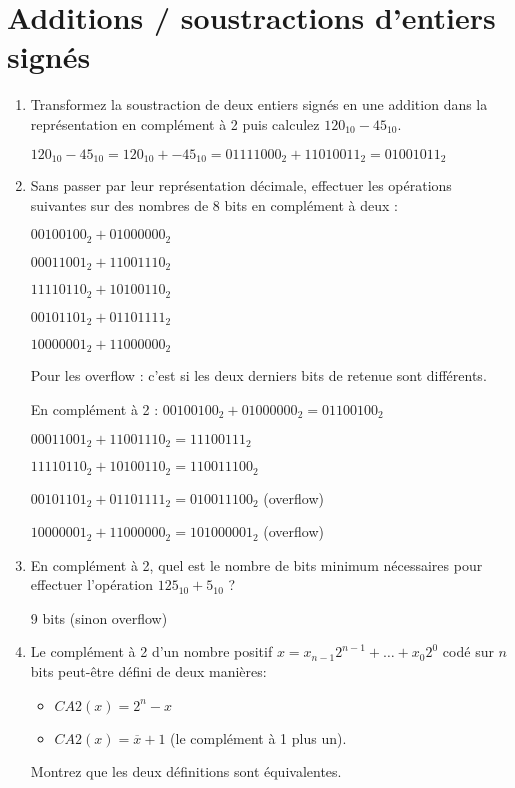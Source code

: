 \documentclass[a4paper,10pt]{exam}
\begin{document}
\section{Additions / soustractions d'entiers sign\'es}
\begin{enumerate}
\item Transformez la soustraction de deux entiers sign\'es en une addition dans la repr\'esentation en compl\'ement \`a 2 puis calculez $120_{10}-45_{10}$.

\begin{solution}
$120_{10}-45_{10} = 120_{10} + -45_{10} = 01111000_{2} + 11010011_{2} = 01001011_{2}$
\end{solution}


\item Sans passer par leur repr\'esentation d\'ecimale, effectuer les op\'erations suivantes sur des nombres de 8 bits en compl\'ement \`a deux :

$00100100_{2} + 01000000_{2}$

$00011001_{2} + 11001110_{2}$

$11110110_{2} + 10100110_{2}$

$00101101_{2} + 01101111_{2}$

$10000001_{2} + 11000000_{2}$

\begin{solution}
Pour les overflow : c'est si les deux derniers bits de retenue sont diff\'erents.

En compl\'ement \`a 2 :
$00100100_{2} + 01000000_{2} = 01100100_{2}$

$00011001_{2} + 11001110_{2} = 11100111_{2}$

$11110110_{2} + 10100110_{2} = 110011100_{2}$

$00101101_{2} + 01101111_{2} = 010011100_{2}$ (overflow)

$10000001_{2} + 11000000_{2} = 101000001_{2}$ (overflow)

\end{solution}

\item En compl\'ement \`a 2, quel est le nombre de bits minimum n\'ecessaires pour effectuer l'op\'eration $125_{10} + 5_{10}$ ?

\begin{solution}
9 bits (sinon overflow)
\end{solution}

\item Le complément à 2 d'un nombre positif $x = x_{n-1}2^{n-1} + \dots + x_{0}2^{0}$ codé sur $n$ bits peut-être défini de deux manières:
  \begin{itemize}
    \item $CA2(x) = 2^n-x$
    \item $CA2(x) = \overline{x} + 1$ (le complément à 1 plus un).
  \end{itemize}
  Montrez que les deux définitions sont équivalentes.


\end{enumerate}
\end{document}

